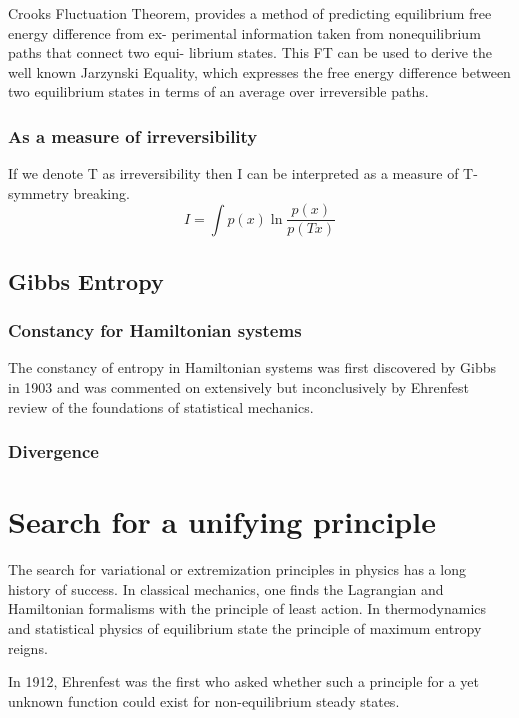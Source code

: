 \documentclass[a4paper,12pt,nofootinbib]{article}
\begin{document}
Crooks Fluctuation Theorem, provides a method of predicting equilibrium free energy difference from ex- perimental information taken from nonequilibrium paths that connect two equi- librium states. This FT can be used to derive the well known Jarzynski Equality, which expresses the free energy difference between two equilibrium states in terms of an average over irreversible paths.

\subsubsection{As a measure of irreversibility}
If we denote T as irreversibility then I can be interpreted as a measure of T-symmetry breaking.
\begin{displaymath}
  I =\int p(x) \ln{\frac{p( x)}{p(T x)}}
\end{displaymath}



\subsection{Gibbs Entropy}

\subsubsection{Constancy for Hamiltonian systems}

The constancy of entropy in Hamiltonian systems was first discovered by Gibbs in 1903 and was commented on extensively but inconclusively by Ehrenfest review of the foundations of statistical mechanics.

\subsubsection{Divergence}




\section{Search for a unifying principle}

The search for variational or extremization principles in physics has a long history of success. In classical mechanics, one finds the Lagrangian and Hamiltonian formalisms with the principle of least action. In thermodynamics and statistical physics of equilibrium state the principle of maximum entropy reigns. 

In 1912, Ehrenfest was the first who asked whether such a principle for a yet unknown function could exist for non-equilibrium steady states. 
\end{document}
